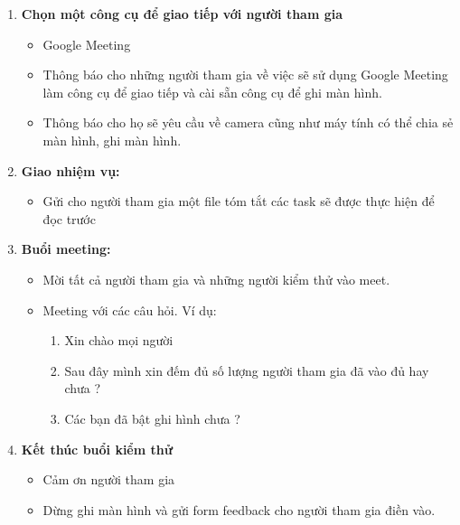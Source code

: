 \documentclass[a4paper]{article}
\begin{document}
\begin{enumerate}
\item \textbf{Chọn một công cụ để giao tiếp với người tham gia}
\begin{itemize}
\item Google Meeting
\item Thông báo cho những người tham gia về việc sẽ sử dụng Google Meeting làm công cụ để giao tiếp và cài sẵn công cụ để ghi màn hình.
\item Thông báo cho họ sẽ yêu cầu về camera cũng như máy tính có thể chia sẻ màn hình, ghi màn hình.
\end{itemize}

\item \textbf{Giao nhiệm vụ:}
\begin{itemize}
\item Gửi cho người tham gia một file tóm tắt các task sẽ được thực hiện để đọc trước
\end{itemize}

\item \textbf{Buổi meeting:}
\begin{itemize}
\item Mời tất cả người tham gia và những người kiểm thử vào meet.
\item Meeting với các câu hỏi. Ví dụ:
\begin{enumerate}
\item Xin chào mọi người
\item Sau đây mình xin đếm đủ số lượng người tham gia đã vào đủ hay chưa ?
\item Các bạn đã bật ghi hình chưa ?
\end{enumerate}
\end{itemize}

\item \textbf{Kết thúc buổi kiểm thử}
\begin{itemize}
\item Cảm ơn người tham gia
\item Dừng ghi màn hình và gửi form feedback cho người tham gia điền vào.
\end{itemize}

\end{enumerate}
\end{document}
